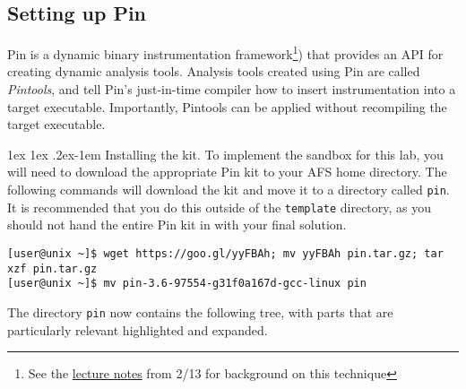 \documentclass[11pt]{article}
\makeatletter
\renewcommand{\paragraph}{%
  \@startsection{paragraph}{4}%
  {\z@}{1ex \@plus 1ex \@minus .2ex}{-1em}%
  {\normalfont\normalsize\bfseries}
}
\makeatother
\begin{document}
\subsection{Setting up Pin} 
\label{sect:pinsetup}
Pin is a dynamic binary instrumentation framework\footnote{See the \href{https://15316-cmu.github.io/lectures/09-automata.pdf}{lecture notes} from 2/13 for background on this technique}) that provides an API for creating dynamic analysis tools. Analysis tools created using Pin are called \emph{Pintools}, and tell Pin's just-in-time compiler how to insert instrumentation into a target executable. Importantly, Pintools can be applied without recompiling the target executable.

\paragraph{Installing the kit.}
To implement the sandbox for this lab, you will need to download the appropriate Pin kit to your AFS home directory. The following commands will download the kit and move it to a directory called \verb'pin'. It is recommended that you do this outside of the \verb'template' directory, as you should not hand the entire Pin kit in with your final solution.
\begin{lstlisting}[basicstyle=\footnotesize\ttfamily,backgroundcolor=\color{gray!15}]
[user@unix ~]$ wget https://goo.gl/yyFBAh; mv yyFBAh pin.tar.gz; tar xzf pin.tar.gz
[user@unix ~]$ mv pin-3.6-97554-g31f0a167d-gcc-linux pin
\end{lstlisting}
The directory \verb'pin' now contains the following tree, with parts that are particularly relevant highlighted and expanded.
\\


\vspace*{1em}
\end{document}
